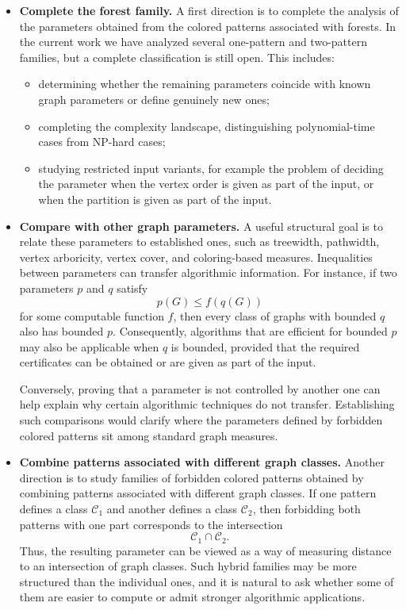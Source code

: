 \documentclass[11pt]{article}
\theoremstyle{definition}
\theoremstyle{plain}
\theoremstyle{remark}
\begin{document}
\begin{itemize}
\item \textbf{Complete the forest family.}
  A first direction is to complete the analysis of the parameters obtained from the colored patterns associated with forests.
  In the current work we have analyzed several one-pattern and two-pattern families, but a complete classification is still open.
  This includes:
  \begin{itemize}
  \item determining whether the remaining parameters coincide with known graph parameters or define genuinely new ones;
  \item completing the complexity landscape, distinguishing polynomial-time cases from NP-hard cases;
  \item studying restricted input variants, for example the problem of deciding the parameter when the vertex order is given
  as part of the input, or when the partition is given as part of the input.
  \end{itemize}

\item \textbf{Compare with other graph parameters.}
  A useful structural goal is to relate these parameters to established ones, such as treewidth, pathwidth,
  vertex arboricity, vertex cover, and coloring-based measures.
  Inequalities between parameters can transfer algorithmic information. For instance, if two parameters \(p\) and \(q\)
  satisfy
  \[
  p(G)\le f(q(G))
  \]
  for some computable function \(f\), then every class of graphs with bounded \(q\) also has bounded \(p\).
  Consequently, algorithms that are efficient for bounded \(p\) may also be applicable when \(q\) is bounded,
  provided that the required certificates can be obtained or are given as part of the input.

  Conversely, proving that a parameter is not controlled by another one can help explain why certain algorithmic
  techniques do not transfer. Establishing such comparisons would clarify where the parameters defined by forbidden
  colored patterns sit among standard graph measures.

\item \textbf{Combine patterns associated with different graph classes.}
  Another direction is to study families of forbidden colored patterns obtained by combining patterns associated with
  different graph classes. If one pattern defines a class \(\mathcal C_1\) and another defines a class \(\mathcal C_2\),
  then forbidding both patterns with one part corresponds to the intersection
  \[
  \mathcal C_1\cap \mathcal C_2.
  \]
  Thus, the resulting parameter can be viewed as a way of measuring distance to an intersection of graph classes.
  Such hybrid families may be more structured than the individual ones, and it is natural to ask whether some of them
  are easier to compute or admit stronger algorithmic applications.


\end{itemize}
\end{document}
